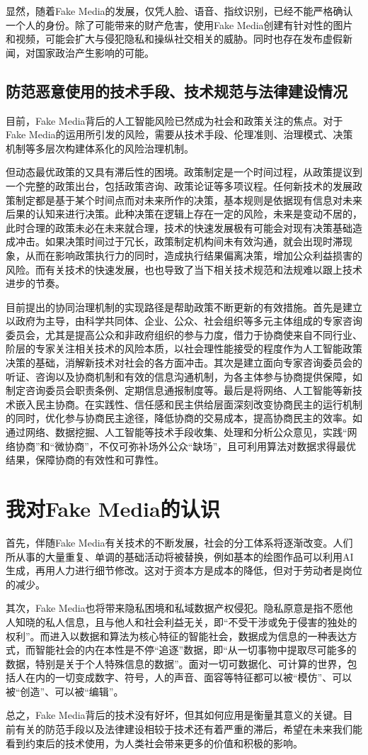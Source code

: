 \documentclass[12pt]{article} %
\begin{document}
显然，随着Fake Media的发展，仅凭人脸、语音、指纹识别，已经不能严格确认一个人的身份。除了可能带来的财产危害，使用Fake Media创建有针对性的图片和视频，可能会扩大与侵犯隐私和操纵社交相关的威胁。同时也存在发布虚假新闻，对国家政治产生影响的可能。
\subsection{防范恶意使用的技术手段、技术规范与法律建设情况}
目前，Fake Media背后的人工智能风险已然成为社会和政策关注的焦点。对于Fake Media的运用所引发的风险，需要从技术手段、伦理准则、治理模式、决策机制等多层次构建体系化的风险治理机制。

但动态最优政策的又具有滞后性的困境。政策制定是一个时间过程，从政策提议到一个完整的政策出台，包括政策咨询、政策论证等多项议程。任何新技术的发展政策制定都是基于某个时间点而对未来所作的决策，基本规则是依据现有信息对未来后果的认知来进行决策。此种决策在逻辑上存在一定的风险，未来是变动不居的，此时合理的政策未必在未来就合理，技术的快速发展极有可能会对现有决策基础造成冲击。如果决策时间过于冗长，政策制定机构间未有效沟通，就会出现时滞现象，从而在影响政策执行力的同时，造成执行结果偏离决策，增加公众利益损害的风险。而有关技术的快速发展，也也导致了当下相关技术规范和法规难以跟上技术进步的节奏。

目前提出的协同治理机制的实现路径是帮助政策不断更新的有效措施。首先是建立以政府为主导，由科学共同体、企业、公众、社会组织等多元主体组成的专家咨询委员会，尤其是提高公众和非政府组织的参与力度，借力于协商使来自不同行业、阶层的专家关注相关技术的风险本质，以社会理性能接受的程度作为人工智能政策决策的基础，消解新技术对社会的各方面冲击。其次是建立面向专家咨询委员会的听证、咨询以及协商机制和有效的信息沟通机制，为各主体参与协商提供保障，如制定咨询委员会职责条例、定期信息通报制度等。最后是将网络、人工智能等新技术嵌入民主协商。在实践性、信任感和民主供给层面深刻改变协商民主的运行机制的同时，优化参与协商民主途径，降低协商的交易成本，提高协商民主的效率。如通过网络、数据挖掘、人工智能等技术手段收集、处理和分析公众意见，实践“网络协商”和“微协商”，不仅可弥补场外公众“缺场”，且可利用算法对数据求得最优结果，保障协商的有效性和可靠性。

\section{我对Fake Media的认识}
首先，伴随Fake Media有关技术的不断发展，社会的分工体系将逐渐改变。人们所从事的大量重复、单调的基础活动将被替换，例如基本的绘图作品可以利用AI生成，再用人力进行细节修改。这对于资本方是成本的降低，但对于劳动者是岗位的减少。

其次，Fake Media也将带来隐私困境和私域数据产权侵犯。隐私原意是指不愿他人知晓的私人信息，且与他人和社会利益无关，即“不受干涉或免于侵害的独处的权利”。而进入以数据和算法为核心特征的智能社会，数据成为信息的一种表达方式，而智能社会的内在本性是不停“追逐”数据，即“从一切事物中提取尽可能多的数据，特别是关于个人特殊信息的数据”。面对一切可数据化、可计算的世界，包括人在内的一切变成数字、符号，人的声音、面容等特征都可以被“模仿”、可以被“创造”、可以被“编辑”。

总之，Fake Media背后的技术没有好坏，但其如何应用是衡量其意义的关键。目前有关的防范手段以及法律建设相较于技术还有着严重的滞后，希望在未来我们能看到约束后的技术使用，为人类社会带来更多的价值和积极的影响。
\end{document}
